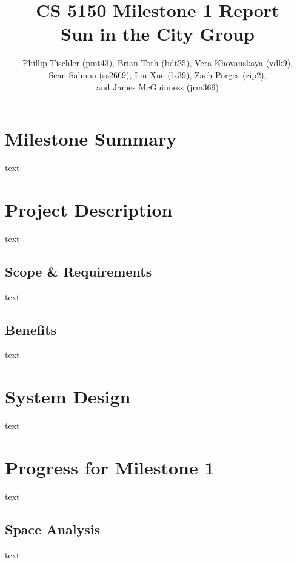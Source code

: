 \documentclass[12pt]{article} %
\title{CS 5150 Milestone 1 Report \\ Sun in the City Group}
\author{Phillip Tischler (pmt43), Brian Toth (bdt25), Vera Khovanskaya (vdk9), \\ 
Sean Salmon (ss2669), Lin Xue (lx39), Zach Porges (zip2),  \\
and James McGuinness (jrm369)}
\begin{document}
\maketitle
\tableofcontents
\clearpage

\section{Milestone Summary}

text

\section{Project Description}

text

\subsection{Scope \& Requirements}

text

\subsection{Benefits}

text

\section{System Design}

text

\section{Progress for Milestone 1}

text

\subsection{Space Analysis}

text
\end{document}
